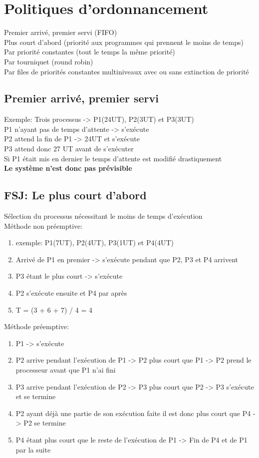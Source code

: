 \section{Politiques d'ordonnancement}
Premier arrivé, premier servi (FIFO)\\
Plus court d'abord (priorité aux programmes qui prennent le moins de temps)\\
Par priorité constantes (tout le temps la même priorité)\\
Par tourniquet (round robin)\\
Par files de priorités constantes multiniveaux avec ou sans extinction de priorité

\subsection{Premier arrivé, premier servi}
Exemple: Trois processus -> P1(24UT), P2(3UT) et P3(3UT)\\
P1 n'ayant pas de temps d'attente -> s'exécute\\
P2 attend la fin de P1 -> 24UT et s'exécute\\
P3 attend donc 27 UT avant de s'exécuter\\
Si P1 était mis en dernier le temps d'attente est modifié drastiquement\\
\textbf{Le système n'est donc pas prévisible}

\subsection{FSJ: Le plus court d'abord}
Sélection du processus nécessitant le moins de temps d'exécution\\
Méthode non préemptive:
\begin{enumerate}
\item exemple: P1(7UT), P2(4UT), P3(1UT) et P4(4UT)
\item Arrivé de P1 en premier -> s'exécute pendant que P2, P3 et P4 arrivent
\item P3 étant le plus court -> s'exécute
\item P2 s'exécute ensuite et P4 par après
\item T = (3 + 6 + 7) / 4 = 4
\end{enumerate}
Méthode préemptive:
\begin{enumerate}
\item P1 -> s'exécute
\item P2 arrive pendant l'exécution de P1 -> P2 plus court que P1 -> P2 prend le processeur avant que P1 n'ai fini
\item P3 arrive pendant l'exécution de P2 -> P3 plus court que P2 -> P3 s'exécute et se termine
\item P2 ayant déjà une partie de son exécution faite il est donc plus court que P4 -> P2 se termine
\item P4 étant plus court que le reste de l'exécution de P1 -> Fin de P4 et de P1 par la suite
\end{enumerate}
